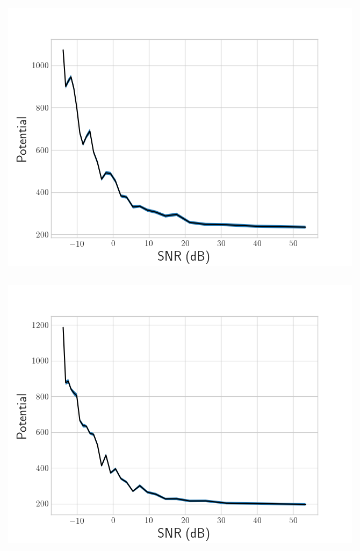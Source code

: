 \begin{figure}[!h]
\centering
\begin{subfigure}{.5\textwidth}
  \centering
  \includegraphics[width=\linewidth]{figures/noisy-signal-ip}
\end{subfigure}%
\begin{subfigure}{.5\textwidth}
  \centering
  \includegraphics[width=\linewidth]{figures/noisy-signal-dm-snr}
\end{subfigure}
\end{figure}



